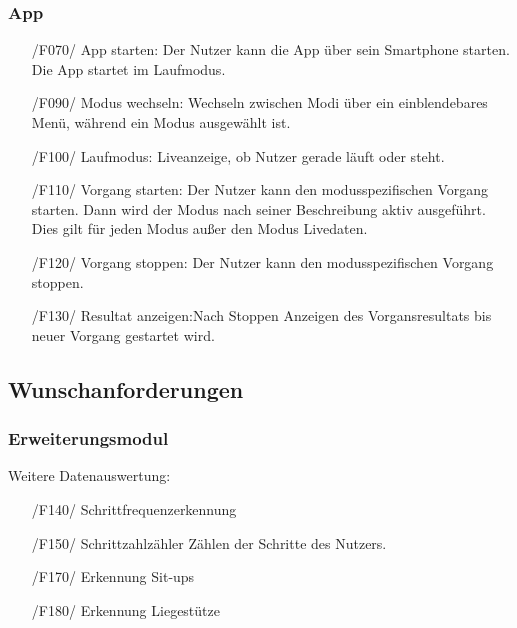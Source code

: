 \documentclass[a4paper,12pt]{article}
\begin{document}
    \subsubsection{App}
      \begin{itemize}
      \item[/F070/] \textsf{App starten:} Der Nutzer kann die App über sein Smartphone starten. Die App startet im Laufmodus.
      \item[/F090/] \textsf{Modus wechseln:} Wechseln zwischen Modi über ein einblendebares Menü, während ein Modus ausgewählt ist.
      \item[/F100/] \textsf{Laufmodus:} Liveanzeige, ob Nutzer gerade \glqq läuft\grqq{} oder \glqq steht\grqq{}.
      \item[/F110/] \textsf{Vorgang starten:} Der Nutzer kann den modusspezifischen Vorgang starten. Dann wird der Modus nach seiner Beschreibung aktiv ausgeführt. Dies gilt für jeden Modus außer den Modus \glqq Livedaten\grqq.
      \item[/F120/] \textsf{Vorgang stoppen:} Der Nutzer kann den modusspezifischen Vorgang stoppen.
      \item[/F130/] \textsf{Resultat anzeigen:}Nach Stoppen Anzeigen des Vorgansresultats bis neuer Vorgang gestartet wird.
    \end{itemize}
  \subsection{Wunschanforderungen}
    \subsubsection{Erweiterungsmodul}
      Weitere Datenauswertung:
      \begin{itemize}
      \item[/F140/] \textsf{Schrittfrequenzerkennung}
      \item[/F150/] \textsf{Schrittzahlzähler} Zählen der Schritte des Nutzers.
      \item[/F170/] \textsf{Erkennung Sit-ups}
      \item[/F180/] \textsf{Erkennung Liegestütze}
      \end{itemize} 
\end{document}
